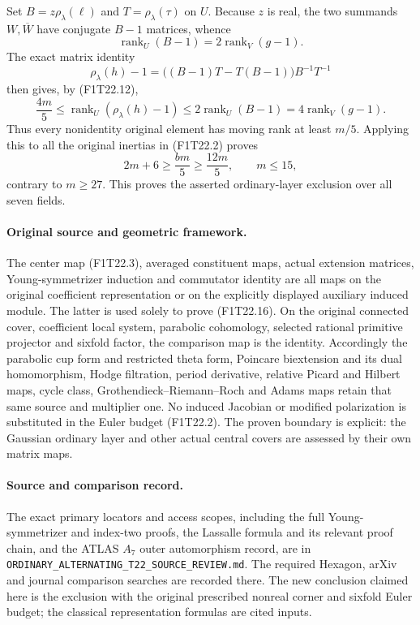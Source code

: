 Set \(B=z\rho_\lambda(\ell)\) and
\(T=\rho_\lambda(\tau)\) on \(U\). Because
\(z\) is real, the two summands \(W,\overline W\)
have conjugate \(B-1\) matrices, whence
\[
 \operatorname{rank}_U(B-1)
       =2\operatorname{rank}_V(g-1).
 \tag{F1T22.14}
\]
The exact matrix identity
\[
 \rho_\lambda(h)-1
   =\big((B-1)T-T(B-1)\big)B^{-1}T^{-1}
 \tag{F1T22.15}
\]
then gives, by (F1T22.12),
\[
 \frac{4m}{5}
 \le\operatorname{rank}_U(\rho_\lambda(h)-1)
 \le2\operatorname{rank}_U(B-1)
 =4\operatorname{rank}_V(g-1).
 \tag{F1T22.16}
\]
Thus every nonidentity original element has moving rank
at least \(m/5\). Applying this to all the original
inertias in (F1T22.2) proves
\[
          2m+6\ge\frac{bm}{5}\ge\frac{12m}{5},
          \qquad m\le15,
 \tag{F1T22.17}
\]
contrary to \(m\ge27\). This proves the asserted
ordinary-layer exclusion over all seven fields.

\paragraph{Original source and geometric framework.}
The center map (F1T22.3), averaged constituent maps,
actual extension matrices, Young-symmetrizer induction
and commutator identity are all maps on the original
coefficient representation or on the explicitly displayed
auxiliary induced module. The latter is used solely to
prove (F1T22.16). On the original connected cover,
coefficient local system, parabolic cohomology, selected
rational primitive projector and sixfold factor, the
comparison map is the identity. Accordingly the
parabolic cup form and restricted theta form, Poincare
biextension and its dual homomorphism, Hodge filtration,
period derivative, relative Picard and Hilbert maps,
cycle class, Grothendieck--Riemann--Roch and Adams maps
retain that same source and multiplier one. No induced
Jacobian or modified polarization is substituted in the
Euler budget (F1T22.2). The proven boundary is explicit:
the Gaussian ordinary layer and other actual central
covers are assessed by their own matrix maps.

\paragraph{Source and comparison record.}
The exact primary locators and access scopes, including
the full Young-symmetrizer and index-two proofs, the
Lassalle formula and its relevant proof chain, and the
ATLAS \(A_7\) outer automorphism record, are in
\texttt{ORDINARY\_\allowbreak ALTERNATING\_\allowbreak T22\_\allowbreak SOURCE\_\allowbreak REVIEW.md}.
The required Hexagon, arXiv and journal comparison
searches are recorded there. The new conclusion claimed
here is the exclusion with the original prescribed
nonreal corner and sixfold Euler budget; the classical
representation formulas are cited inputs.
